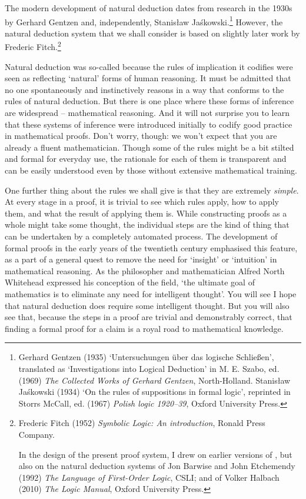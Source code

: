 
The modern development of natural deduction dates from research in the 1930s by Gerhard Gentzen and, independently, Stanisław Jaśkowski.\footnote{Gerhard Gentzen (1935) `Untersuchungen über das logische Schließen', translated as `Investigations into Logical Deduction' in M. E. Szabo, ed. (1969) \emph{The Collected Works of Gerhard Gentzen}, North-Holland. Stanisław Jaśkowski (1934) `On the rules of suppositions in formal logic', reprinted in Storrs McCall, ed. (1967) \emph{Polish logic 1920–39}, Oxford University Press.} However, the natural deduction system that we shall consider is based on slightly later work by Frederic Fitch.\footnote{Frederic Fitch (1952) \emph{Symbolic Logic: An introduction}, Ronald Press Company. 

In the design of the present proof system, I drew on earlier versions of \forallx, but also on the natural deduction systems of Jon Barwise and John Etchemendy (1992) \emph{The Language of First-Order Logic}, CSLI; and of Volker Halbach (2010) \emph{The Logic Manual}, Oxford University Press.} 

Natural deduction was so-called because the rules of implication it codifies were seen as reflecting `natural' forms of human reasoning. It must be admitted that no one spontaneously and instinctively reasons in a way that conforms to the rules of natural deduction. But there is one place where these forms of inference are widespread – mathematical reasoning. And it will not surprise you to learn that these systems of inference were introduced initially to codify good practice in mathematical proofs. Don't worry, though: we won't expect that you are already a fluent mathematician. Though some of the rules might be a bit stilted and formal for everyday use, the rationale for each of them is transparent and can be easily understood even by those without extensive mathematical training.

One further thing about the rules we shall give is that they are extremely \emph{simple}. At every stage in a proof, it is trivial to see which rules apply, how to apply them, and what the result of applying them is. While constructing proofs as a whole might take some thought, the individual steps are the kind of thing that can be undertaken by a completely automated process. The development of formal proofs in the early years of the twentieth century emphasised this feature, as a part of a general quest to remove the need for `insight' or `intuition' in mathematical reasoning. As the philosopher and mathematician Alfred North Whitehead expressed his conception of the field, `the ultimate goal of mathematics is to eliminate any need for intelligent thought'. You will see I hope that natural deduction does require some intelligent thought. But you will also see that, because the steps in a proof are trivial and demonstrably correct, that finding a formal proof for a claim is a royal road to mathematical knowledge. 

